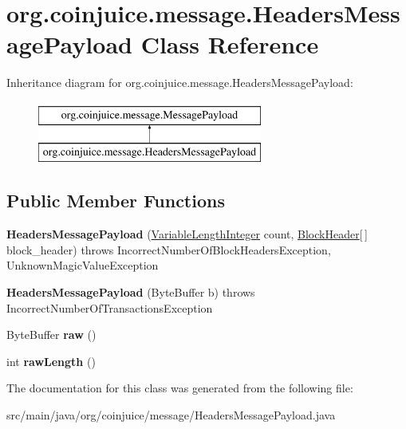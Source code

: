 \hypertarget{classorg_1_1coinjuice_1_1message_1_1_headers_message_payload}{\section{org.\-coinjuice.\-message.\-Headers\-Message\-Payload Class Reference}
\label{classorg_1_1coinjuice_1_1message_1_1_headers_message_payload}
}
Inheritance diagram for org.\-coinjuice.\-message.\-Headers\-Message\-Payload\-:\begin{figure}[H]
\begin{center}
\leavevmode
\includegraphics[height=2.000000cm]{classorg_1_1coinjuice_1_1message_1_1_headers_message_payload}
\end{center}
\end{figure}
\subsection*{Public Member Functions}
\begin{DoxyCompactItemize}
\item 
\hypertarget{classorg_1_1coinjuice_1_1message_1_1_headers_message_payload_a277855fece84a1310638b05f9dde1cc7}{{\bfseries Headers\-Message\-Payload} (\hyperlink{classorg_1_1coinjuice_1_1message_1_1field_1_1_variable_length_integer}{Variable\-Length\-Integer} count, \hyperlink{classorg_1_1coinjuice_1_1message_1_1field_1_1_block_header}{Block\-Header}\mbox{[}$\,$\mbox{]} block\-\_\-header)  throws Incorrect\-Number\-Of\-Block\-Headers\-Exception, Unknown\-Magic\-Value\-Exception }\label{classorg_1_1coinjuice_1_1message_1_1_headers_message_payload_a277855fece84a1310638b05f9dde1cc7}

\item 
\hypertarget{classorg_1_1coinjuice_1_1message_1_1_headers_message_payload_a22ca996477f37f90c7249aad3918eb88}{{\bfseries Headers\-Message\-Payload} (Byte\-Buffer b)  throws Incorrect\-Number\-Of\-Transactions\-Exception }\label{classorg_1_1coinjuice_1_1message_1_1_headers_message_payload_a22ca996477f37f90c7249aad3918eb88}

\item 
\hypertarget{classorg_1_1coinjuice_1_1message_1_1_headers_message_payload_a40b9a7ea92469726418c9bfd6d3c273c}{Byte\-Buffer {\bfseries raw} ()}\label{classorg_1_1coinjuice_1_1message_1_1_headers_message_payload_a40b9a7ea92469726418c9bfd6d3c273c}

\item 
\hypertarget{classorg_1_1coinjuice_1_1message_1_1_headers_message_payload_a391fef5fa40bbbedd629cf28b8a5ccf3}{int {\bfseries raw\-Length} ()}\label{classorg_1_1coinjuice_1_1message_1_1_headers_message_payload_a391fef5fa40bbbedd629cf28b8a5ccf3}

\end{DoxyCompactItemize}


The documentation for this class was generated from the following file\-:\begin{DoxyCompactItemize}
\item 
src/main/java/org/coinjuice/message/Headers\-Message\-Payload.\-java\end{DoxyCompactItemize}
